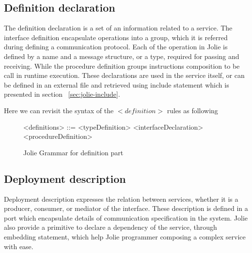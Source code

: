 \FloatBarrier

\subsection{Definition declaration}
\label{sec:jolie-def}

The definition declaration is a set of an information related to a service. The interface definition encapsulate operations into a group, which it is referred during defining a communication protocol. Each of the operation in Jolie is defined by a name and a message structure, or a type, required for passing and receiving. While the procedure definition groups instructions composition to be call in runtime execution. These declarations are used in the service itself, or can be defined in an external file and retrieved using include statement which is presented in section ~\ref{sec:jolie-include}.







Here we can revisit the syntax of the \(<definition>\) rules as following

\begin{figure}[h]
    \begin{framed}
        \begin{grammar}
            <definitions> ::= <typeDefinition>
            \alt <interfaceDeclaration>
            \alt <procedureDefinition>
        \end{grammar}
    \end{framed}
    \caption{Jolie Grammar for definition part}
    \label{fig:jolie-definition}
\end{figure}

\subsection{Deployment description}

Deployment description expresses the relation between services, whether it is a producer, consumer, or mediator of the interface.
These description is defined in a port which encapsulate details of communication specification in the system.
Jolie also provide a primitive to declare a dependency of the service, through embedding statement, which help Jolie programmer composing a complex service with ease.

